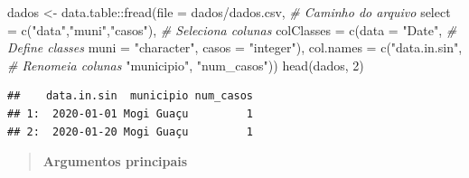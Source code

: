 \documentclass[
]{book}
\newenvironment{Shaded}{\begin{snugshade}}{\end{snugshade}}
\newcommand{\AttributeTok}[1]{\textcolor[rgb]{0.77,0.63,0.00}{#1}}
\newcommand{\CommentTok}[1]{\textcolor[rgb]{0.56,0.35,0.01}{\textit{#1}}}
\newcommand{\DecValTok}[1]{\textcolor[rgb]{0.00,0.00,0.81}{#1}}
\newcommand{\FunctionTok}[1]{\textcolor[rgb]{0.00,0.00,0.00}{#1}}
\newcommand{\NormalTok}[1]{#1}
\newcommand{\OtherTok}[1]{\textcolor[rgb]{0.56,0.35,0.01}{#1}}
\newcommand{\SpecialCharTok}[1]{\textcolor[rgb]{0.00,0.00,0.00}{#1}}
\newcommand{\StringTok}[1]{\textcolor[rgb]{0.31,0.60,0.02}{#1}}
\theoremstyle{definition}
\theoremstyle{definition}
\theoremstyle{definition}
\theoremstyle{definition}
\theoremstyle{remark}
\begin{document}
\begin{Shaded}
\begin{Highlighting}[]
\NormalTok{dados }\OtherTok{\textless{}{-}}\NormalTok{ data.table}\SpecialCharTok{::}\FunctionTok{fread}\NormalTok{(}\AttributeTok{file =} \StringTok{\textquotesingle{}dados/dados.csv\textquotesingle{}}\NormalTok{,            }\CommentTok{\# Caminho do arquivo}
                           \AttributeTok{select =} \FunctionTok{c}\NormalTok{(}\StringTok{"data"}\NormalTok{,}\StringTok{"muni"}\NormalTok{,}\StringTok{"casos"}\NormalTok{),   }\CommentTok{\# Seleciona colunas}
                           \AttributeTok{colClasses =} \FunctionTok{c}\NormalTok{(}\AttributeTok{data =} \StringTok{"Date"}\NormalTok{,        }\CommentTok{\# Define classes}
                                          \AttributeTok{muni =} \StringTok{"character"}\NormalTok{,}
                                          \AttributeTok{casos =} \StringTok{"integer"}\NormalTok{),}
                           \AttributeTok{col.names =} \FunctionTok{c}\NormalTok{(}\StringTok{"data.in.sin"}\NormalTok{,         }\CommentTok{\# Renomeia colunas}
                                         \StringTok{"municipio"}\NormalTok{, }
                                         \StringTok{"num\_casos"}\NormalTok{)) }
\FunctionTok{head}\NormalTok{(dados, }\DecValTok{2}\NormalTok{)}
\end{Highlighting}
\end{Shaded}

\begin{verbatim}
##    data.in.sin  municipio num_casos
## 1:  2020-01-01 Mogi Guaçu         1
## 2:  2020-01-20 Mogi Guaçu         1
\end{verbatim}

\begin{quote}
\textbf{Argumentos principais}
\end{quote}
\end{document}
